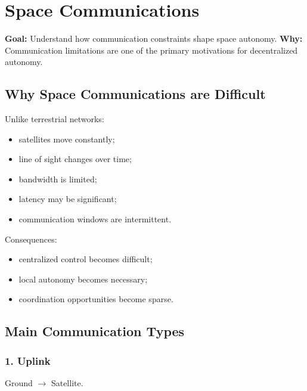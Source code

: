 \documentclass[10pt,a4paper,twocolumn]{article}
\newcommand{\lesson}[3]{
\section{#1}
\noindent
\textbf{Goal:} #2 \newline
\textbf{Why:} #3
\vspace{0.1em}
}
\begin{document}

\lesson
{Space Communications}
{Understand how communication constraints shape space autonomy.}
{Communication limitations are one of the primary motivations for decentralized autonomy.}


\subsection{Why Space Communications are Difficult}

Unlike terrestrial networks:
\begin{itemize}
    \item satellites move constantly;
    \item line of sight changes over time;
    \item bandwidth is limited;
    \item latency may be significant;
    \item communication windows are intermittent.
\end{itemize}

Consequences:
\begin{itemize}
    \item centralized control becomes difficult;
    \item local autonomy becomes necessary;
    \item coordination opportunities become sparse.
\end{itemize}


\subsection{Main Communication Types}


\subsubsection*{1. Uplink}

Ground
$\rightarrow$
Satellite.
\end{document}

